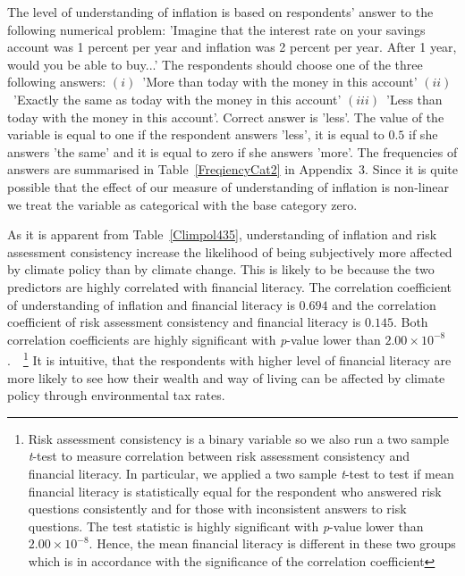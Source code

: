 \documentclass[a4paper,12pt]{article}
\begin{document}
The level of understanding of inflation is based on respondents' answer to the following numerical problem: 'Imagine that the interest rate on your savings account was 1 percent per year and
inflation was 2 percent per year. After 1 year, would you be able to buy...' The respondents should choose one of the three following answers: $(i)$~'More than today with the money in
this account' $(ii)$~'Exactly the same as today with the money in
this account' $(iii)$~'Less than today with the money in
this account'. Correct answer is 'less'. The value of the variable is equal to one if the respondent answers 'less', it is equal to $0.5$ if she answers 'the same' and it is equal to zero if she answers 'more'. The frequencies of answers are summarised in Table~\ref{FreqiencyCat2} in Appendix~$3$. Since it is quite possible that the effect of our measure of understanding of inflation is non-linear we treat the variable as categorical with the base category zero. 


As it is apparent from Table~\ref{Climpol435}, understanding of inflation and risk assessment consistency increase the likelihood of being subjectively more affected by climate policy than by climate change. This is likely to be because the two predictors are highly correlated with financial literacy. The correlation coefficient of understanding of inflation and financial literacy is $0.694$ and the correlation coefficient of risk assessment consistency and financial literacy is $0.145$. Both correlation coefficients are highly significant with \textit{p}-value lower than $2.00\times 10^{-8}$.~~\footnote{Risk assessment consistency is a binary variable so we also run a two sample \textit{t}-test to measure correlation between risk assessment consistency and financial literacy. In particular, we applied a two sample \textit{t}-test to test if mean financial literacy is statistically equal for the respondent who answered risk questions consistently and for those with inconsistent answers to risk questions. The test statistic is highly significant with \textit{p}-value lower than $2.00\times 10^{-8}$. Hence, the mean financial literacy is different in these two groups which is in accordance with the significance of the correlation coefficient} It is intuitive, that the respondents with higher level of financial literacy are more likely to see how their wealth and way of living can be affected by climate policy through environmental tax rates. 
\end{document}
